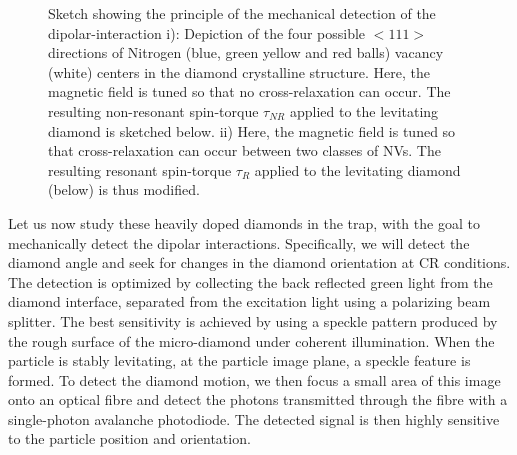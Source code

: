 \documentclass[preprintnumbers,amsmath,amssymb,superscriptaddress,twocolumn,showpacs]{revtex4-1}
\begin{document}
\begin{figure}[!ht]
  \centering {}
  \caption{Sketch showing the principle of the mechanical detection of the dipolar-interaction i): Depiction of the four possible $<111>$ directions of Nitrogen (blue, green yellow and red balls) vacancy (white) centers in the diamond crystalline structure. Here, the magnetic field is tuned so that no cross-relaxation can occur.
The resulting non-resonant spin-torque $\tau_{NR}$ applied to the levitating diamond is sketched below. 
ii) Here, the magnetic field is tuned so that cross-relaxation can occur between two classes of NVs.
The resulting resonant spin-torque $\tau_{R}$ applied to the levitating diamond (below) is thus modified. 
  }\label{principle}
\end{figure}

%

Let us now study these heavily doped diamonds in the trap, with the goal to mechanically detect the dipolar interactions.
Specifically, we will detect the diamond angle and seek for changes in the diamond orientation at CR conditions. The detection is optimized by collecting the back reflected green light from the diamond interface, separated from the excitation light using a polarizing beam splitter. The best sensitivity is achieved by using a speckle pattern produced by the rough surface of the micro-diamond under coherent illumination. When the particle is stably levitating, at the particle image plane, a speckle feature is formed. To detect the diamond motion, we then focus a small area of this image onto an optical fibre and detect the photons transmitted through the fibre with a single-photon avalanche photodiode. The detected signal is then highly sensitive to the particle position and orientation.

\end{document}
